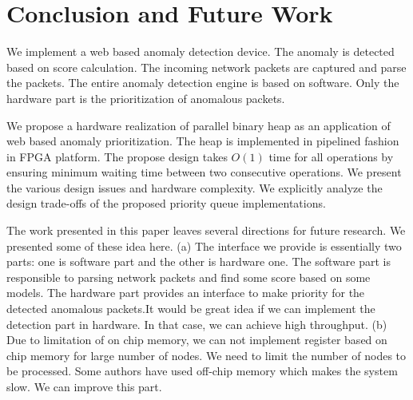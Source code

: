 \documentclass[10pt, conference, compsocconf]{IEEEtran}
\begin{document}
\section{Conclusion and Future Work}
We implement a web based anomaly detection device. The anomaly is detected based on score calculation. The incoming network packets are captured and parse the packets. The entire anomaly detection engine is based on software. Only the hardware part is the prioritization of anomalous packets.

We propose a hardware realization of parallel binary heap as an application of web based anomaly prioritization. The heap is implemented in pipelined fashion in FPGA platform. The propose design takes $O(1)$ time for all operations by ensuring minimum waiting time between two consecutive operations. We present the various design issues and hardware complexity. We explicitly analyze the design trade-offs of the proposed priority queue implementations.

The work presented in this paper leaves several directions for future research. We presented some of these idea here. (a) The interface we provide is essentially two parts: one is software part and the other is hardware one. The software part is responsible to parsing network packets and find some score based on some models. The hardware part provides an interface to make priority for the detected anomalous packets.It would be great idea if we can implement the detection part in hardware. In that case, we can achieve high throughput. (b) Due to limitation of on chip memory, we can not implement register based on chip memory for large number of nodes. We need to limit the number of nodes to be processed. Some authors have used off-chip memory which makes the system slow. We can improve this part.
\end{document}
